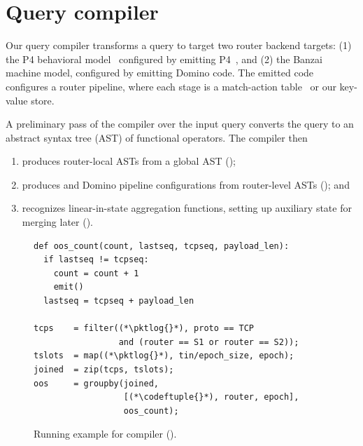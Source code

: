 \section{Query compiler}
\label{sec:compiler}

Our query compiler transforms a \TheSystem query to target two router backend
targets: (1) the P4 behavioral model~\cite{p4-bmv2} configured by emitting
P4~\cite{p4}, and (2) the Banzai machine model, configured by emitting
Domino code. The emitted code configures a router pipeline,
where each stage is a match-action table~\cite{openflow} or our key-value store.

A preliminary pass of the compiler over the input query converts the query to an
abstract syntax tree (AST) of functional operators. The compiler then
\begin{enumerate}
\item produces router-local ASTs from a global AST
  ();
\item produces \pfs and Domino pipeline configurations from router-level ASTs
  (); and
\item recognizes linear-in-state aggregation functions, setting up
  auxiliary state for merging later ().
\end{enumerate}

\begin{figure}[!t]{
\figcodesize
\begin{lstlisting}
def oos_count(count, lastseq, tcpseq, payload_len):
  if lastseq != tcpseq:
    count = count + 1
    emit()
  lastseq = tcpseq + payload_len

tcps    = filter((*\pktlog{}*), proto == TCP
                 and (router == S1 or router == S2));
tslots  = map((*\pktlog{}*), tin/epoch_size, epoch);
joined  = zip(tcps, tslots);
oos     = groupby(joined,
                  [(*\codeftuple{}*), router, epoch],
                  oos_count);
\end{lstlisting}
}
\caption{Running example for \TheSystem compiler ().}
\label{fig:running-example-code}
\end{figure}


